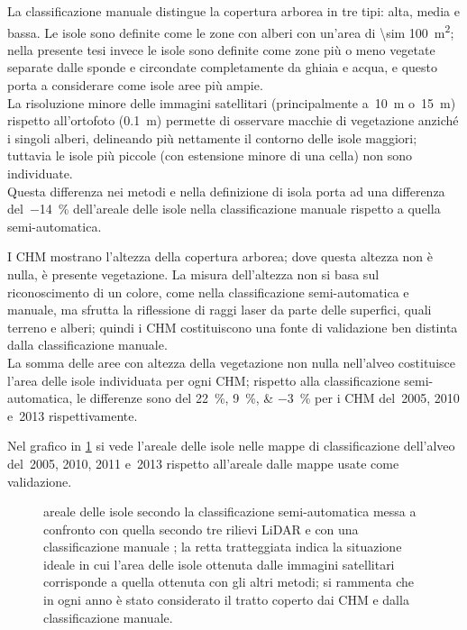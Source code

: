 \begin{aenumerate}
	\item La classificazione manuale distingue la copertura arborea in tre tipi: alta, media e bassa.
	Le isole sono definite come le zone con alberi con un'area di \SI{\sim 100}{\m\tothe{2}}; nella presente tesi invece le isole sono definite come zone più o meno vegetate separate dalle sponde e circondate completamente da ghiaia e acqua, e questo porta a considerare come isole aree più ampie.
	\\
	La risoluzione minore delle immagini satellitari (principalmente a~\SI{10}{\m} o~\SI{15}{\m}) rispetto all'ortofoto (\SI{0.1}{\m}) permette di osservare macchie di vegetazione anziché i singoli alberi, delineando più nettamente il contorno delle isole maggiori; tuttavia le isole più piccole (con estensione minore di una cella) non sono individuate.
	\\
	Questa differenza nei metodi e nella definizione di isola porta ad una differenza del~\SI{-14}{\percent} dell'areale delle isole nella classificazione manuale rispetto a quella semi-automatica.
	\item I CHM mostrano l'altezza della copertura arborea; dove questa altezza non è nulla, è presente vegetazione.
	La misura dell'altezza non si basa sul riconoscimento di un colore, come nella classificazione semi-automatica e manuale, ma sfrutta la riflessione di raggi laser da parte delle superfici, quali terreno e alberi; quindi i CHM costituiscono una fonte di validazione ben distinta dalla classificazione manuale.
	\\
	La somma delle aree con altezza della vegetazione non nulla nell'alveo costituisce l'area delle isole individuata per ogni CHM; rispetto alla classificazione semi-automatica, le differenze sono del \SIlist[list-separator = {, }, list-final-separator = { e }, retain-explicit-plus]{+22;+9;-3}{\percent} per i CHM del~2005, 2010 e~2013 rispettivamente.
\end{aenumerate}
%
Nel grafico in \cref{graph:validazione-class-is-fl} si vede l'areale delle isole nelle mappe di classificazione dell'alveo del~2005, 2010, 2011 e~2013 rispetto all'areale dalle mappe usate come validazione.
%
\begin{figure}
	\centering
	
	\caption[validazione della classificazione considerando le aree delle isole]{areale delle isole secondo la classificazione semi-automatica messa a confronto con quella secondo tre rilievi LiDAR e con una classificazione manuale ; la retta tratteggiata indica la situazione ideale in cui l'area delle isole ottenuta dalle immagini satellitari corrisponde a quella ottenuta con gli altri metodi; si rammenta che in ogni anno è stato considerato il tratto coperto dai CHM e dalla classificazione manuale.}
	\label{graph:validazione-class-is-fl}
\end{figure}
